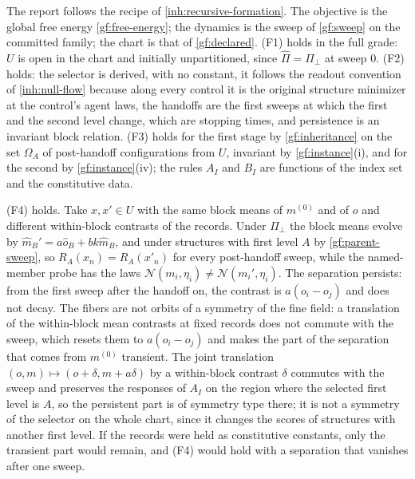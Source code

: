 The report follows the recipe of \cref{inh:recursive-formation}. The
objective is the global free energy \cref{gf:free-energy}; the dynamics is
the sweep of \cref{gf:sweep} on the committed family; the chart is that of
\cref{gf:declared}. (F1) holds in the full grade: $U$ is open in the chart and
initially unpartitioned, since $\hat\Pi=\Pi_\perp$ at sweep $0$. (F2) holds:
the selector is derived, with no constant, it follows the readout convention
of \cref{inh:null-flow} because along every control it is the original
structure minimizer at the control's agent laws, the handoffs are the first
sweeps at which the first and the second level change, which are stopping
times, and persistence is an invariant block relation. (F3) holds for the
first stage by \cref{gf:inheritance} on the set $\Omega_A$ of post-handoff
configurations from $U$, invariant by \cref{gf:instance}(i), and for the
second by \cref{gf:instance}(iv); the rules $A_I$ and $B_I$ are functions of
the index set and the constitutive data.

(F4) holds. Take $x,x'\in U$ with the same block means of $m^{(0)}$ and of
$o$ and different within-block contrasts of the records. Under $\Pi_\perp$ the
block means evolve by $\hat m_B'=a\hat o_B+bk\hat m_B$, and under structures
with first level $A$ by \cref{gf:parent-sweep}, so $R_A(x_n)=R_A(x'_n)$ for
every post-handoff sweep, while the named-member probe has the laws
$\mathcal N(m_i,\eta_i)\neq\mathcal N(m_i',\eta_i)$. The separation persists:
from the first sweep after the handoff on, the contrast is $a(o_i-o_j)$ and does
not decay. The fibers are not orbits of a symmetry of the fine field: a
translation of the within-block mean contrasts at fixed records does not
commute with the sweep, which resets them to $a(o_i-o_j)$ and makes the part
of the separation that comes from $m^{(0)}$ transient. The joint translation
$(o,m)\mapsto(o+\delta,m+a\delta)$ by a within-block contrast $\delta$
commutes with the sweep and preserves the responses of $A_I$ on the region
where the selected first level is $A$, so the persistent part is of symmetry
type there; it is not a symmetry of the selector on the whole chart, since it
changes the scores of structures with another first level. If the records
were held as constitutive constants, only the transient part would remain,
and (F4) would hold with a separation that vanishes after one sweep.

